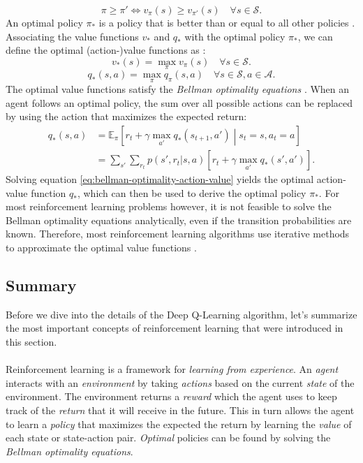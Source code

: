\begin{equation}
    \pi \geq \pi' \Leftrightarrow v_\pi(s) \geq v_{\pi'}(s) \quad \forall s \in \mathcal{S} \text{.}
    \label{eq:policy-ordering}
\end{equation} 
An optimal policy $\pi_*$ is a policy that is better than or equal to all other policies \cite[62]{sutton_reinforcement_nodate}. Associating the value functions $v_*$ and $q_*$ with the optimal policy $\pi_*$, we can define the optimal (action-)value functions as \cite[ch. 3.6]{sutton_reinforcement_nodate}:
\begin{equation}
    v_*(s) = \max_\pi v_\pi(s) \quad \forall s \in \mathcal{S} \text{.}
    \label{eq:optimal-value-function}
\end{equation}
\begin{equation}
    q_*(s, a) = \max_\pi q_\pi(s, a) \quad \forall s \in \mathcal{S}, a \in \mathcal{A} \text{.}
    \label{eq:optimal-action-value-function}
\end{equation}
The optimal value functions satisfy the \textit{Bellman optimality equations} \cite[ch. 3.6]{sutton_reinforcement_nodate}. When an agent follows an optimal policy, the sum over all possible actions can be replaced by using the action that maximizes the expected return:
\begin{align}
    q_*(s, a) &= \mathbb{E}_\pi \left[ r_t + \gamma \max_{a'} q_*(s_{t+1}, a') \middle| s_t = s, a_t = a \right] \nonumber \\
    &= \sum_{s'} \sum_{r_t} p(s', r_t | s, a) \left[ r_t + \gamma \max_{a'} q_*(s', a') \right] \text{.}
    \label{eq:bellman-optimality-action-value}
\end{align}
Solving equation \ref{eq:bellman-optimality-action-value} yields the optimal action-value function $q_*$, which can then be used to derive the optimal policy $\pi_*$. For most reinforcement learning problems however, it is not feasible to solve the Bellman optimality equations analytically, even if the transition probabilities are known. Therefore, most reinforcement learning algorithms use iterative methods to approximate the optimal value functions \cite[ch. 4]{sutton_reinforcement_nodate}.


\subsection{Summary}
Before we dive into the details of the Deep Q-Learning algorithm, let's summarize the most important concepts of reinforcement learning that were introduced in this section.
\\
\\
Reinforcement learning is a framework for \textit{learning from experience}.
An \textit{agent} interacts with an \textit{environment} by taking \textit{actions} based on the current \textit{state} of the environment.
The environment returns a \textit{reward} which the agent uses to keep track of the \textit{return} that it will receive in the future.
This in turn allows the agent to learn a \textit{policy} that maximizes the expected the return by learning the \textit{value} of each state or state-action pair.
\textit{Optimal} policies can be found by solving the \textit{Bellman optimality equations}.



